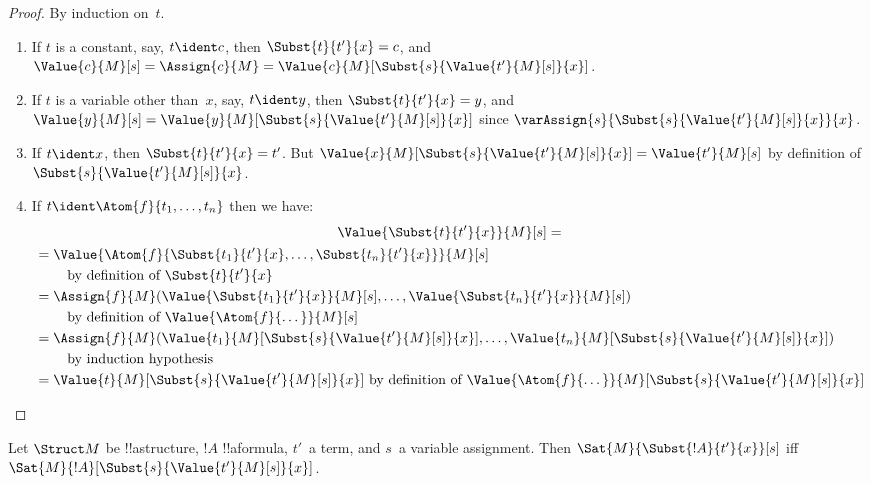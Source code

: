 \begin{proof}
By induction on~$t$.
\begin{enumerate}
\item If $t$ is a constant, say, $t\ident c$, then $\Subst{t}{t'}{x} =
  c$, and $\Value{c}{M}[s] = \Assign{c}{M} =
  \Value{c}{M}[\Subst{s}{\Value{t'}{M}[s]}{x}]$.

\item If $t$ is a variable other than~$x$, say, $t \ident y$, then
  $\Subst{t}{t'}{x} = y$, and $\Value{y}{M}[s] =
  \Value{y}{M}[\Subst{s}{\Value{t'}{M}[s]}{x}]$ since
  $\varAssign{s}{\Subst{s}{\Value{t'}{M}[s]}{x}}{x}$.

\item If $t \ident x$, then $\Subst{t}{t'}{x} = t'$. But
  $\Value{x}{M}[\Subst{s}{\Value{t'}{M}[s]}{x}] = \Value{t'}{M}[s]$ by
  definition of~$\Subst{s}{\Value{t'}{M}[s]}{x}$.

\item If $t \ident \Atom{f}{t_1,\dots,t_n}$ then we have:
\begin{multline*}
  \Value{\Subst{t}{t'}{x}}{M}[s]  = \\
  \begin{aligned}[b]
& = \Value{\Atom{f}{\Subst{t_1}{t'}{x}, \dots, \Subst{t_n}{t'}{x}}}{M}[s]\\
& \qquad    \text{ by definition of $\Subst{t}{t'}{x}$}\\
& = \Assign{f}{M}(\Value{\Subst{t_1}{t'}{x}}{M}[s], \dots,
    \Value{\Subst{t_n}{t'}{x}}{M}[s])\\
    & \qquad  \text{ by definition of $\Value{\Atom{f}{\dots}}{M}[s]$}\\
& = \Assign{f}{M}(\Value{t_1}{M}[\Subst{s}{\Value{t'}{M}[s]}{x}], \dots,
   \Value{t_n}{M}[\Subst{s}{\Value{t'}{M}[s]}{x}])\\
& \qquad    \text{ by induction hypothesis}\\
& = \Value{t}{M}[\Subst{s}{\Value{t'}{M}[s]}{x}]
    \text{ by definition of $\Value{\Atom{f}{\dots}}{M}[\Subst{s}{\Value{t'}{M}[s]}{x}]$}
  \end{aligned}
\end{multline*}
\end{enumerate}
\end{proof}

\begin{prop} Let $\Struct M$ be
!!a{structure}, $!A$ !!a{formula}, $t'$~a term, and $s$~a variable
assignment. Then $\Sat{M}{\Subst{!A}{t'}{x}}[s]$ iff
$\Sat{M}{!A}[\Subst{s}{\Value{t'}{M}[s]}{x}]$.
\end{prop}

